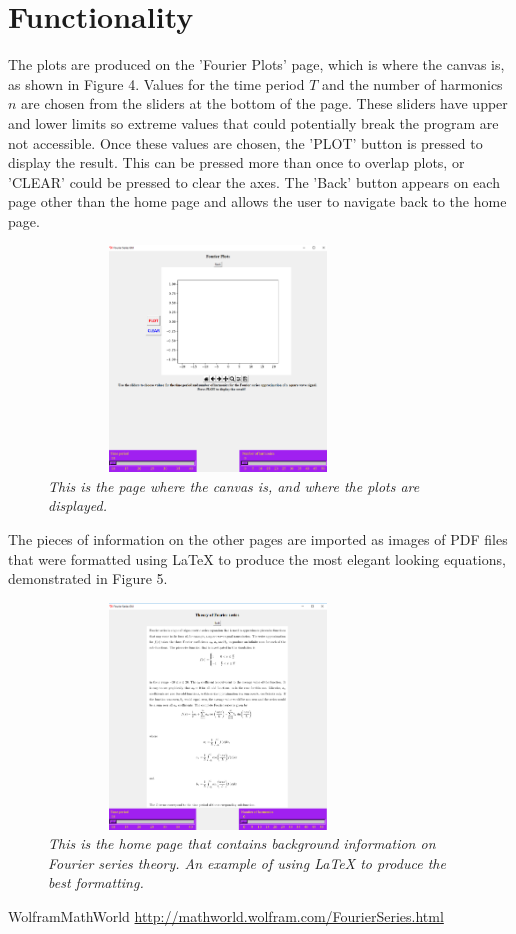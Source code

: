 \documentclass[11pt]{article}								%
\begin{document}
\section{Functionality \label{sec:section3}}
The plots are produced on the 'Fourier Plots' page, which is where the canvas is, as shown in Figure 4. Values for the time period $T$ and the number of harmonics $n$ are chosen from the sliders at the bottom of the page. These sliders have upper and lower limits so extreme values that could potentially break the program are not accessible. Once these values are chosen, the 'PLOT' button is pressed to display the result. This can be pressed more than once to overlap plots, or 'CLEAR' could be pressed to clear the axes. The 'Back' button appears on each page other than the home page and allows the user to navigate back to the home page.
\begin{figure}[ht]
\includegraphics[width=9cm, height=6cm]{plot_page}
\centering
\caption{\emph{This is the page where the canvas is, and where the plots are displayed.}}
\label{fig:plotpg}
\end{figure}
The pieces of information on the other pages are imported as images of PDF files that were formatted using LaTeX to produce the most elegant looking equations, demonstrated in Figure 5.
\begin{figure}[ht]
\includegraphics[width=9cm, height=6cm]{ft_page}
\centering
\caption{\emph{This is the home page that contains background information on Fourier series theory. An example of using LaTeX to produce the best formatting.}}
\label{fig:ftpg}
\end{figure}



\begin{thebibliography}{widest-label}
 WolframMathWorld \url{http://mathworld.wolfram.com/FourierSeries.html}

\end{thebibliography}
\end{document}
